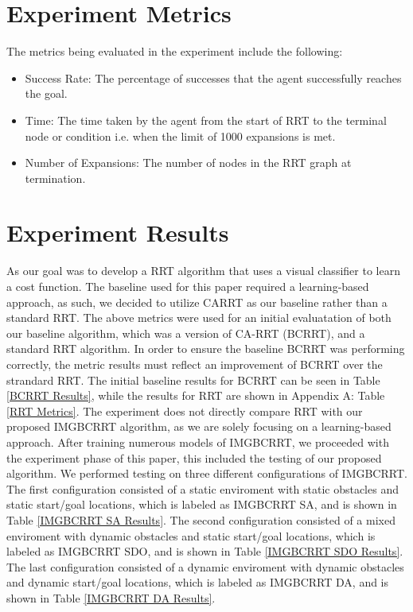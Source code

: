 \documentclass{article}
\begin{document}
\section{Experiment Metrics}

The metrics being evaluated in the experiment include the following:
\begin{itemize}
	\item{Success Rate: The percentage of successes that the agent successfully reaches the goal.}
	\item{Time: The time taken by the agent from the start of RRT to the terminal node or condition i.e. when the limit of 1000 expansions is met.}
	\item{Number of Expansions: The number of nodes in the RRT graph at termination.}
\end{itemize}

\section{Experiment Results}
As our goal was to develop a RRT algorithm that uses a visual classifier to learn a cost function. The baseline used for this paper required a learning-based approach, as such, we decided to utilize CARRT as our baseline rather than a standard RRT. The above metrics were used for an initial evaluatation of both our baseline algorithm, which was a version of CA-RRT (BCRRT), and a standard RRT algorithm. In order to ensure the baseline BCRRT was performing correctly, the metric results must reflect an improvement of BCRRT over the strandard RRT. The initial baseline results for BCRRT can be seen in Table \ref{BCRRT Results}, while the results for RRT are shown in Appendix A: Table \ref{RRT Metrics}. The experiment does not directly compare RRT with our proposed IMGBCRRT algorithm, as we are solely focusing on a learning-based approach. After training numerous models of IMGBCRRT, we proceeded with the experiment phase of this paper, this included the testing of our proposed algorithm. We performed testing on three different configurations of IMGBCRRT. The first configuration consisted of a static enviroment with static obstacles and static start/goal locations, which is labeled as IMGBCRRT SA, and is shown in Table \ref{IMGBCRRT SA Results}. The second configuration consisted of a mixed enviroment with dynamic obstacles and static start/goal locations, which is labeled as IMGBCRRT SDO, and is shown in Table \ref{IMGBCRRT SDO Results}. The last configuration consisted of a dynamic enviroment with dynamic obstacles and dynamic start/goal locations, which is labeled as IMGBCRRT DA, and is shown in Table \ref{IMGBCRRT DA Results}. 
\end{document}
